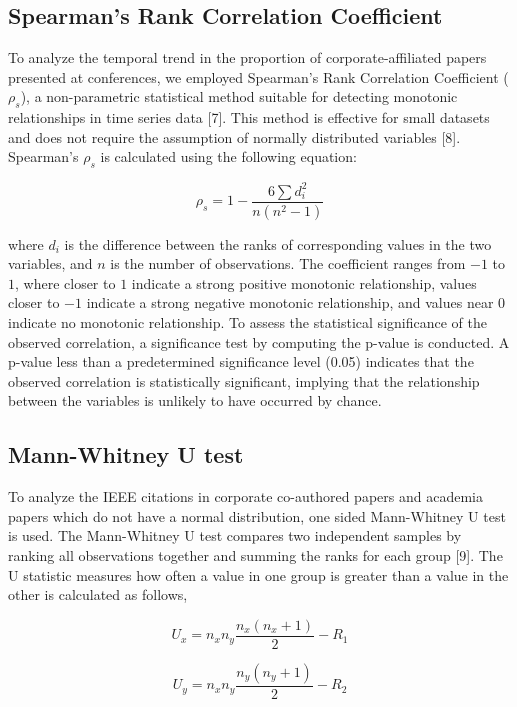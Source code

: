 \documentclass{article}
\begin{document}
\subsection{Spearman's Rank Correlation Coefficient}
To analyze the temporal trend in the proportion of corporate-affiliated papers presented at conferences, we employed Spearman's Rank Correlation Coefficient ($\rho_s$), a non-parametric statistical method suitable for detecting monotonic relationships in time series data [7]. This method is effective for small datasets and does not require the assumption of normally distributed variables [8]. Spearman's $\rho_s$ is calculated using the following equation:

\begin{equation}
\rho_s = 1 - \frac{6 \sum d_i^2}{n(n^2 - 1)}
\end{equation}

where $d_i$ is the difference between the ranks of corresponding values in the two variables, and $n$ is the number of observations. The coefficient ranges from $-1$ to $1$, where closer to $1$ indicate a strong positive monotonic relationship, values closer to $-1$ indicate a strong negative monotonic relationship, and values near $0$ indicate no monotonic relationship. To assess the statistical significance of the observed correlation, a significance test by computing the p-value is conducted. A p-value less than a predetermined significance level (0.05) indicates that the observed correlation is statistically significant, implying that the relationship between the variables is unlikely to have occurred by chance.

\subsection{Mann-Whitney U test}
To analyze the IEEE citations in corporate co-authored papers and academia papers which do not have a normal distribution, one sided Mann-Whitney U test is used. The Mann-Whitney U test compares two independent samples by ranking all observations together and summing the ranks for each group [9]. The U statistic measures how often a value in one group is greater than a value in the other is calculated as follows,

\begin{equation}
U_x = n_xn_y\frac{n_x(n_x+1)}{2}-R_1
\end{equation}

\begin{equation}
    U_y = n_xn_y\frac{n_y(n_y+1)}{2}-R_2
\end{equation}
\end{document}
